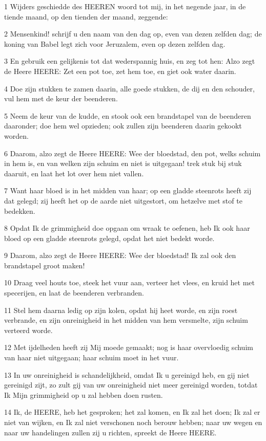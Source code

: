 \par 1 Wijders geschiedde des HEEREN woord tot mij, in het negende jaar, in de tiende maand, op den tienden der maand, zeggende:
\par 2 Mensenkind! schrijf u den naam van den dag op, even van dezen zelfden dag; de koning van Babel legt zich voor Jeruzalem, even op dezen zelfden dag.
\par 3 En gebruik een gelijkenis tot dat wederspannig huis, en zeg tot hen: Alzo zegt de Heere HEERE: Zet een pot toe, zet hem toe, en giet ook water daarin.
\par 4 Doe zijn stukken te zamen daarin, alle goede stukken, de dij en den schouder, vul hem met de keur der beenderen.
\par 5 Neem de keur van de kudde, en stook ook een brandstapel van de beenderen daaronder; doe hem wel opzieden; ook zullen zijn beenderen daarin gekookt worden.
\par 6 Daarom, alzo zegt de Heere HEERE: Wee der bloedstad, den pot, welks schuim in hem is, en van welken zijn schuim en niet is uitgegaan! trek stuk bij stuk daaruit, en laat het lot over hem niet vallen.
\par 7 Want haar bloed is in het midden van haar; op een gladde steenrots heeft zij dat gelegd; zij heeft het op de aarde niet uitgestort, om hetzelve met stof te bedekken.
\par 8 Opdat Ik de grimmigheid doe opgaan om wraak te oefenen, heb Ik ook haar bloed op een gladde steenrots gelegd, opdat het niet bedekt worde.
\par 9 Daarom, alzo zegt de Heere HEERE: Wee der bloedstad! Ik zal ook den brandstapel groot maken!
\par 10 Draag veel houts toe, steek het vuur aan, verteer het vlees, en kruid het met specerijen, en laat de beenderen verbranden.
\par 11 Stel hem daarna ledig op zijn kolen, opdat hij heet worde, en zijn roest verbrande, en zijn onreinigheid in het midden van hem versmelte, zijn schuim verteerd worde.
\par 12 Met ijdelheden heeft zij Mij moede gemaakt; nog is haar overvloedig schuim van haar niet uitgegaan; haar schuim moet in het vuur.
\par 13 In uw onreinigheid is schandelijkheid, omdat Ik u gereinigd heb, en gij niet gereinigd zijt, zo zult gij van uw onreinigheid niet meer gereinigd worden, totdat Ik Mijn grimmigheid op u zal hebben doen rusten.
\par 14 Ik, de HEERE, heb het gesproken; het zal komen, en Ik zal het doen; Ik zal er niet van wijken, en Ik zal niet verschonen noch berouw hebben; naar uw wegen en naar uw handelingen zullen zij u richten, spreekt de Heere HEERE.
